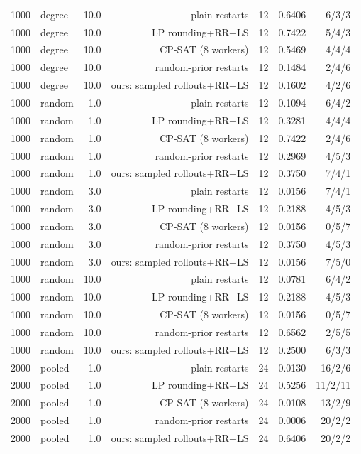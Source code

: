 \begin{table}[t]
\begin{tabular}{llrrrrr}
1000 & degree & 10.0 & plain restarts & 12 & 0.6406 & 6/3/3 \\
1000 & degree & 10.0 & LP rounding+RR+LS & 12 & 0.7422 & 5/4/3 \\
1000 & degree & 10.0 & CP-SAT (8 workers) & 12 & 0.5469 & 4/4/4 \\
1000 & degree & 10.0 & random-prior restarts & 12 & 0.1484 & 2/4/6 \\
1000 & degree & 10.0 & ours: sampled rollouts+RR+LS & 12 & 0.1602 & 4/2/6 \\
1000 & random & 1.0 & plain restarts & 12 & 0.1094 & 6/4/2 \\
1000 & random & 1.0 & LP rounding+RR+LS & 12 & 0.3281 & 4/4/4 \\
1000 & random & 1.0 & CP-SAT (8 workers) & 12 & 0.7422 & 2/4/6 \\
1000 & random & 1.0 & random-prior restarts & 12 & 0.2969 & 4/5/3 \\
1000 & random & 1.0 & ours: sampled rollouts+RR+LS & 12 & 0.3750 & 7/4/1 \\
1000 & random & 3.0 & plain restarts & 12 & 0.0156 & 7/4/1 \\
1000 & random & 3.0 & LP rounding+RR+LS & 12 & 0.2188 & 4/5/3 \\
1000 & random & 3.0 & CP-SAT (8 workers) & 12 & 0.0156 & 0/5/7 \\
1000 & random & 3.0 & random-prior restarts & 12 & 0.3750 & 4/5/3 \\
1000 & random & 3.0 & ours: sampled rollouts+RR+LS & 12 & 0.0156 & 7/5/0 \\
1000 & random & 10.0 & plain restarts & 12 & 0.0781 & 6/4/2 \\
1000 & random & 10.0 & LP rounding+RR+LS & 12 & 0.2188 & 4/5/3 \\
1000 & random & 10.0 & CP-SAT (8 workers) & 12 & 0.0156 & 0/5/7 \\
1000 & random & 10.0 & random-prior restarts & 12 & 0.6562 & 2/5/5 \\
1000 & random & 10.0 & ours: sampled rollouts+RR+LS & 12 & 0.2500 & 6/3/3 \\
2000 & pooled & 1.0 & plain restarts & 24 & 0.0130 & 16/2/6 \\
2000 & pooled & 1.0 & LP rounding+RR+LS & 24 & 0.5256 & 11/2/11 \\
2000 & pooled & 1.0 & CP-SAT (8 workers) & 24 & 0.0108 & 13/2/9 \\
2000 & pooled & 1.0 & random-prior restarts & 24 & 0.0006 & 20/2/2 \\
2000 & pooled & 1.0 & ours: sampled rollouts+RR+LS & 24 & 0.6406 & 20/2/2 \\

\end{tabular}
\end{table}
